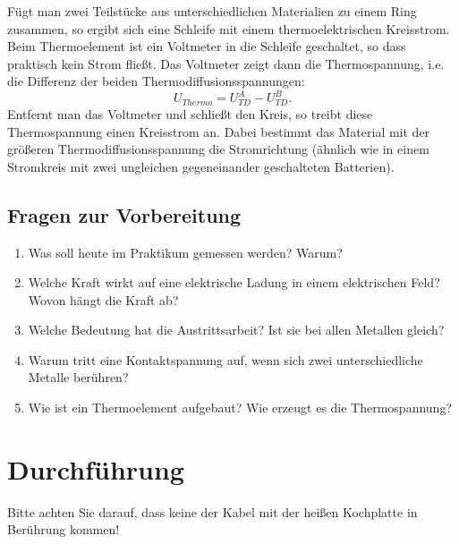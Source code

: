 Fügt man zwei Teilstücke aus unterschiedlichen Materialien zu einem Ring zusammen, so ergibt sich eine Schleife mit einem thermoelektrischen Kreisstrom. Beim Thermoelement ist ein Voltmeter in die Schleife geschaltet, so dass praktisch kein Strom fließt. Das Voltmeter zeigt dann die Thermospannung, i.e. die Differenz der beiden Thermodiffusionsspannungen:
\begin{equation}
	U_{Thermo} = U^A_{TD} - U^B_{TD}.
\end{equation}
Entfernt man das Voltmeter und schließt den Kreis, so treibt diese Thermospannung einen Kreisstrom an. Dabei bestimmt das Material mit der größeren Thermodiffusionsspannung die Stromrichtung (ähnlich wie in einem Stromkreis mit zwei ungleichen gegeneinander geschalteten Batterien).

\begin{tutorhint}
\section{Fragen zur Vorbereitung}

\begin{enumerate}
 \item Was soll heute im Praktikum gemessen werden? Warum?
 \item Welche Kraft wirkt auf eine elektrische Ladung in einem elektrischen Feld? Wovon hängt die Kraft ab?
 \item Welche Bedeutung hat die Austrittsarbeit? Ist sie bei allen Metallen gleich?
 \item Warum tritt eine Kontaktspannung auf, wenn sich zwei unterschiedliche Metalle berühren?
 \item Wie ist ein Thermoelement aufgebaut? Wie erzeugt es die Thermospannung?
\end{enumerate}
\end{tutorhint}

\section{Durchführung} 

\begin{hint}
	Bitte achten Sie darauf, dass keine der Kabel mit der heißen Kochplatte in Berührung kommen!
\end{hint}

